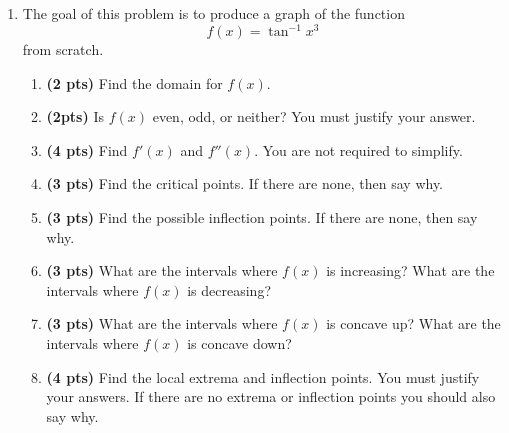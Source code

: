\documentclass[12pt]{article}
\begin{document}
\begin{enumerate}[1.]
\newpage
\item %
The goal of this problem is to produce a graph of the function
\[f(x)=\tan^{-1}{x^3}\]
from scratch.
	
	\begin{enumerate}
	\item {\bf (2 pts)} Find the domain for $f(x)$.
	
	\vspace{8pc}
	\item {\bf (2pts)} Is $f(x)$ even, odd, or neither?  You must justify your answer.
	
	\vspace{10pc}
	\item {\bf (4 pts)} Find $f'(x)$ and $f''(x)$.  You are not required to simplify.
	
	\newpage
	\item {\bf (3 pts)} Find the critical points.  If there are none, then say why.
	
	\vspace{10pc}
	\item {\bf (3 pts)} Find the possible inflection points.  If there are none, then say why.
	
	\vspace{10pc}
	\item {\bf (3 pts)} What are the intervals where $f(x)$ is increasing?  What are the intervals where $f(x)$ is decreasing?
	
	\newpage
	\item {\bf (3 pts)} What are the intervals where $f(x)$ is concave up?  What are the intervals where $f(x)$ is concave down?
	
	\vspace{23pc}
	\item {\bf (4 pts)} Find the local extrema and inflection points.  You must justify your answers.  If there are no extrema or inflection points you should also say why.
	
	\newpage
	
	

\end{enumerate}
\end{enumerate}
\end{document}
